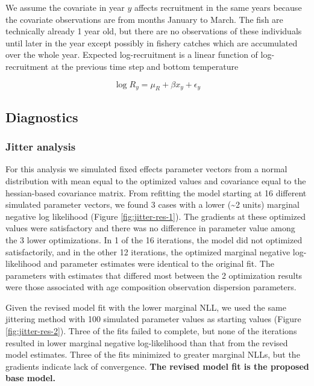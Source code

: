 \documentclass[
]{article}
\begin{document}
We assume the covariate in year \(y\) affects recruitment in the same years because the covariate observations are from months January to March. The fish are technically already 1 year old, but there are no observations of these individuals until later in the year except possibly in fishery catches which are accumulated over the whole year. Expected log-recruitment is a linear function of log-recruitment at the previous time step and bottom temperature

\begin{equation}\label{eq:expected-recruitment}
\log R_y = \mu_R + \beta x_y + \epsilon_y
\end{equation}

\hypertarget{diagnostics}{%
\subsection{Diagnostics}\label{diagnostics}}

\hypertarget{jitter-analysis}{%
\subsubsection{Jitter analysis}\label{jitter-analysis}}

For this analysis we simulated fixed effects parameter vectors from a normal distribution with mean equal to the optimized values and covariance equal to the hessian-based covariance matrix. From refitting the model starting at 16 different simulated parameter vectors, we found 3 cases with a lower (\textasciitilde2 units) marginal negative log likelihood (Figure \ref{fig:jitter-res-1}). The gradients at these optimized values were satisfactory and there was no difference in parameter value among the 3 lower optimizations. In 1 of the 16 iterations, the model did not optimized satisfactorily, and in the other 12 iterations, the optimized marginal negative log-likelihood and parameter estimates were identical to the original fit. The parameters with estimates that differed most between the 2 optimization results were those associated with age composition observation dispersion parameters.

Given the revised model fit with the lower marginal NLL, we used the same jittering method with 100 simulated parameter values as starting values (Figure \ref{fig:jitter-res-2}). Three of the fits failed to complete, but none of the iterations resulted in lower marginal negative log-likelihood than that from the revised model estimates. Three of the fits minimized to greater marginal NLLs, but the gradients indicate lack of convergence. \textbf{The revised model fit is the proposed base model.}
\end{document}

